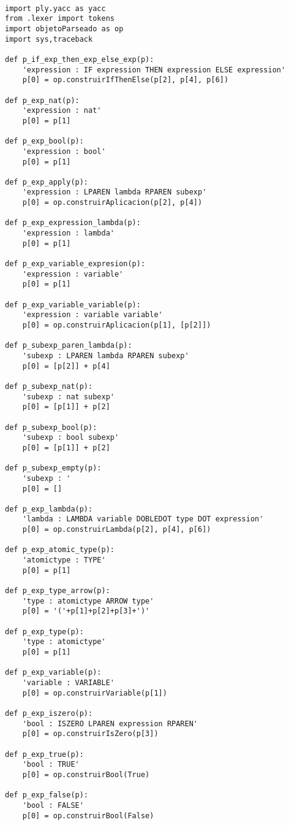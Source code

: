 \begin{verbatim}

import ply.yacc as yacc
from .lexer import tokens
import objetoParseado as op
import sys,traceback

def p_if_exp_then_exp_else_exp(p):
    'expression : IF expression THEN expression ELSE expression'
    p[0] = op.construirIfThenElse(p[2], p[4], p[6])

def p_exp_nat(p):
    'expression : nat'
    p[0] = p[1]

def p_exp_bool(p):
    'expression : bool'    
    p[0] = p[1]

def p_exp_apply(p):
    'expression : LPAREN lambda RPAREN subexp'
    p[0] = op.construirAplicacion(p[2], p[4])

def p_exp_expression_lambda(p):
    'expression : lambda'
    p[0] = p[1]

def p_exp_variable_expresion(p):
    'expression : variable'    
    p[0] = p[1]    

def p_exp_variable_variable(p):
    'expression : variable variable'
    p[0] = op.construirAplicacion(p[1], [p[2]])

def p_subexp_paren_lambda(p):
    'subexp : LPAREN lambda RPAREN subexp'
    p[0] = [p[2]] + p[4]

def p_subexp_nat(p):
    'subexp : nat subexp'
    p[0] = [p[1]] + p[2]

def p_subexp_bool(p):
    'subexp : bool subexp'
    p[0] = [p[1]] + p[2]

def p_subexp_empty(p):
    'subexp : '
    p[0] = []

def p_exp_lambda(p):    
    'lambda : LAMBDA variable DOBLEDOT type DOT expression'
    p[0] = op.construirLambda(p[2], p[4], p[6])

def p_exp_atomic_type(p):
    'atomictype : TYPE'    
    p[0] = p[1]        

def p_exp_type_arrow(p):
    'type : atomictype ARROW type'    
    p[0] = '('+p[1]+p[2]+p[3]+')'

def p_exp_type(p):
    'type : atomictype'
    p[0] = p[1]        

def p_exp_variable(p):
    'variable : VARIABLE'       
    p[0] = op.construirVariable(p[1])        

def p_exp_iszero(p):
    'bool : ISZERO LPAREN expression RPAREN'    
    p[0] = op.construirIsZero(p[3])

def p_exp_true(p):
    'bool : TRUE'
    p[0] = op.construirBool(True)
    
def p_exp_false(p):
    'bool : FALSE'
    p[0] = op.construirBool(False)


\end{verbatim}
